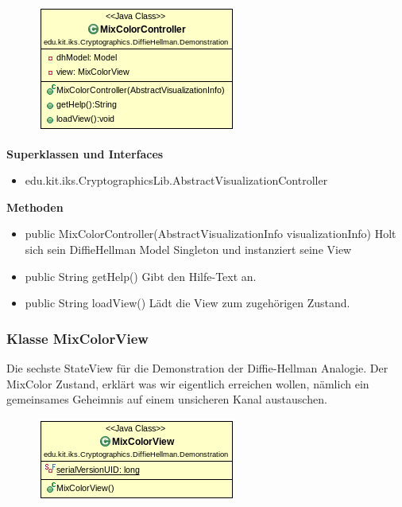 \documentclass{article}
\begin{document}
      \begin{figure}[H]
        \centering
        \includegraphics{resources/edu-kit-iks-Cryptographics-DiffieHellman-Demonstration-MixColorController}
      \end{figure}

      \textbf{Superklassen und Interfaces}
      \begin{itemize}
        \item edu.kit.iks.CryptographicsLib.AbstractVisualizationController
      \end{itemize}

      \textbf{Methoden}
      \begin{itemize}
          \item public MixColorController(AbstractVisualizationInfo visualizationInfo) \newline
              Holt sich sein DiffieHellman Model Singleton und instanziert seine View
        \item public String getHelp() \newline
        Gibt den Hilfe-Text an.
        \item public String loadView() \newline
        Lädt die View zum zugehörigen Zustand.
      \end{itemize}

\subsubsection{Klasse MixColorView}
      Die sechste StateView für die Demonstration der Diffie-Hellman Analogie.
      Der MixColor Zustand, erklärt was wir eigentlich erreichen wollen,
      nämlich ein gemeinsames Geheimnis auf einem unsicheren Kanal austauschen.

      \begin{figure}[H]
        \centering
        \includegraphics{resources/edu-kit-iks-Cryptographics-DiffieHellman-Demonstration-MixColorView}
      \end{figure}
\end{document}
